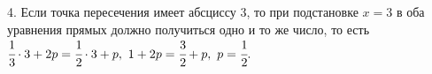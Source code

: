 4. Если точка пересечения имеет абсциссу 3, то при подстановке $x=3$ в оба уравнения прямых должно получиться одно и то же число, то есть
$\cfrac{1}{3}\cdot3+2p=\cfrac{1}{2}\cdot3+p,\ 1+2p=\cfrac{3}{2}+p,\ p=\cfrac{1}{2}.$\\
